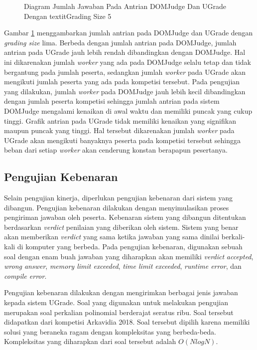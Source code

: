 
\begin{figure}[ht!]
    \centering
    
    \caption{Diagram Jumlah Jawaban Pada Antrian DOMJudge Dan UGrade Dengan textit{Grading Size} 5}
    \label{fig:ugrade-domjudge-queue}
\end{figure}

\par Gambar \ref{fig:ugrade-domjudge-queue} menggambarkan jumlah antrian pada DOMJudge dan UGrade dengan \textit{grading size} lima. Berbeda dengan jumlah antrian pada DOMJudge, jumlah antrian pada UGrade jauh lebih rendah dibandingkan dengan DOMJudge. Hal ini dikarenakan jumlah \textit{worker} yang ada pada DOMJudge selalu tetap dan tidak bergantung pada jumlah peserta, sedangkan jumlah \textit{worker} pada UGrade akan mengikuti jumlah peserta yang ada pada kompetisi tersebut. Pada pengujian yang dilakukan, jumlah \textit{worker} pada DOMJudge jauh lebih kecil dibandingkan dengan jumlah peserta kompetisi sehingga jumlah antrian pada sistem DOMJudge mengalami kenaikan di awal waktu dan memiliki puncak yang cukup tinggi. Grafik antrian pada UGrade tidak memiliki kenaikan yang signifikan maupun puncak yang tinggi. Hal tersebut dikarenakan jumlah \textit{worker} pada UGrade akan mengikuti banyaknya peserta pada kompetisi tersebut sehingga beban dari setiap \textit{worker} akan cenderung konstan berapapun pesertanya.

\subsection{Pengujian Kebenaran}

\par Selain pengujian kinerja, diperlukan pengujian kebenaran dari sistem yang dibangun. Pengujian kebenaran dilakukan dengan menyimulasikan proses pengiriman jawaban oleh peserta. Kebenaran sistem yang dibangun ditentukan berdasarkan \textit{verdict} penilaian yang diberikan oleh sistem. Sistem yang benar akan memberikan \textit{verdict} yang sama ketika jawaban yang sama dinilai berkali-kali di komputer yang berbeda. Pada pengujian kebenaran, digunakan sebuah soal dengan enam buah jawaban yang diharapkan akan memiliki \textit{verdict} \textit{accepted}, \textit{wrong answer}, \textit{memory limit exceeded}, \textit{time limit exceeded}, \textit{runtime error}, dan \textit{compile error}.

\par Pengujian kebenaran dilakukan dengan mengirimkan berbagai jenis jawaban kepada sistem UGrade. Soal yang digunakan untuk melakukan pengujian merupakan soal perkalian polinomial berderajat seratus ribu. Soal tersebut didapatkan dari kompetisi Arkavidia 2018. Soal tersebut dipilih karena memiliki solusi yang beraneka ragam dengan kompleksitas yang berbeda-beda. Kompleksitas yang diharapkan dari soal tersebut adalah $O(N log N)$.

